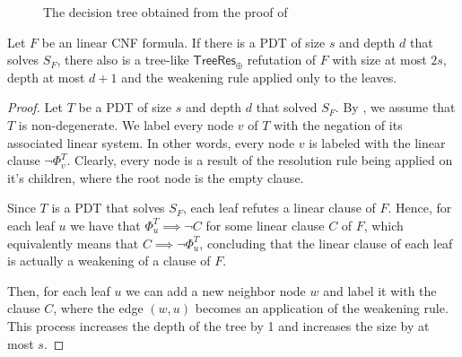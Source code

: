 \begin{figure}[H]
    \centering


    \caption{The decision tree obtained from the proof of }
\end{figure}

\begin{lemma}
    Let $F$ be an linear CNF formula. If there is a PDT of size $s$ and depth $d$ that solves $S_F$, there also is a tree-like $\mathsf{TreeRes}_\oplus$ refutation of $F$ with size at most $2s$, depth at most $d+1$ and the weakening rule applied only to the leaves.
\end{lemma}

\begin{proof}
    Let $T$ be a PDT of size $s$ and depth $d$ that solved $S_F$. By , we assume that $T$ is non-degenerate. We label every node $v$ of $T$ with the negation of its associated linear system. In other words, every node $v$ is labeled with the linear clause $\lnot \Phi_v^T$. Clearly, every node is a result of the resolution rule being applied on it's children, where the root node is the empty clause.

    Since $T$ is a PDT that solves $S_F$, each leaf refutes a linear clause of $F$. Hence, for each leaf $u$ we have that $\Phi_{u}^T \implies \lnot C$ for some linear clause $C$ of $F$, which equivalently means that $C \implies \lnot \Phi_u^T$, concluding that the linear clause of each leaf is actually a weakening of a clause of $F$.
    
    Then, for each leaf $u$ we can add a new neighbor node $w$ and label it with the clause $C$, where the edge $(w,u)$ becomes an application of the weakening rule. This process increases the depth of the tree by 1 and increases the size by at most $s$.
\end{proof}

